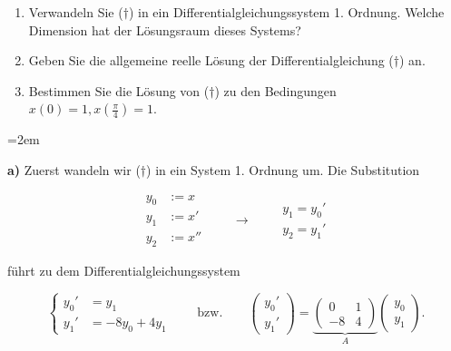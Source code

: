 \begin{enumerate}[label=\alph*)]
    \item Verwandeln Sie (\( \dagger \)) in ein Differentialgleichungssystem 1. Ordnung. Welche Dimension hat der Lösungsraum dieses Systems?
    \item Geben Sie die allgemeine reelle Lösung der Differentialgleichung (\( \dagger \)) an.
    \item Bestimmen Sie die Lösung von (\( \dagger \)) zu den Bedingungen \( x(0) = 1, x(\frac{\pi}{4})=1 \).
\end{enumerate}

\vspace{1\baselineskip}

\begin{solution}    

    \vspace{1\baselineskip}

    \leftskip=2em

    \textbf{a)} Zuerst wandeln wir (\( \dagger \)) in ein System 1. Ordnung um. Die Substitution

    \begin{equation*}
        \begin{aligned}
            y_0 &:= x \\
            y_1 &:= x' \\
            y_2 &:= x''         
        \end{aligned} \qquad \longrightarrow \qquad
        \begin{aligned}
            y_1 = y_0' \\
            y_2 = y_1' 
        \end{aligned}
    \end{equation*}   

    führt zu dem Differentialgleichungssystem
    
    \begin{equation*}
        \left\{ \begin{aligned}
            y_0' &= y_1 \\
            y_1' &= -8y_0 + 4y_1
        \end{aligned} \right. \qquad \text{bzw.} \qquad
        \begin{pmatrix}
            y_0' \\
            y_1'
        \end{pmatrix} =
        \underbrace{\begin{pmatrix}
            0 & 1 \\
            -8 & 4
        \end{pmatrix}}_{A}
        \begin{pmatrix}
            y_0 \\
            y_1
        \end{pmatrix}.
    \end{equation*}


\end{solution}

